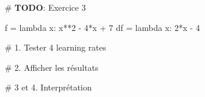 \documentclass[
  french,
  11pt,
  a4paper,
]{scrbook}
\newenvironment{Shaded}{}{}
\newcommand{\AlertTok}[1]{\textcolor[rgb]{1.00,0.33,0.33}{\textbf{#1}}}
\newcommand{\CommentTok}[1]{\textcolor[rgb]{0.42,0.45,0.49}{#1}}
\newcommand{\DecValTok}[1]{\textcolor[rgb]{0.00,0.36,0.77}{#1}}
\newcommand{\KeywordTok}[1]{\textcolor[rgb]{0.84,0.23,0.29}{#1}}
\newcommand{\NormalTok}[1]{\textcolor[rgb]{0.14,0.16,0.18}{#1}}
\newcommand{\OperatorTok}[1]{\textcolor[rgb]{0.14,0.16,0.18}{#1}}
\begin{document}
\begin{Shaded}
\begin{Highlighting}[]
\CommentTok{\# }\AlertTok{TODO}\CommentTok{: Exercice 3}

\NormalTok{f }\OperatorTok{=} \KeywordTok{lambda}\NormalTok{ x: x}\OperatorTok{**}\DecValTok{2} \OperatorTok{{-}} \DecValTok{4}\OperatorTok{*}\NormalTok{x }\OperatorTok{+} \DecValTok{7}
\NormalTok{df }\OperatorTok{=} \KeywordTok{lambda}\NormalTok{ x: }\DecValTok{2}\OperatorTok{*}\NormalTok{x }\OperatorTok{{-}} \DecValTok{4}

\CommentTok{\# 1. Tester 4 learning rates}



\CommentTok{\# 2. Afficher les résultats}


\CommentTok{\# 3 et 4. Interprétation}
\end{Highlighting}
\end{Shaded}
\end{document}
